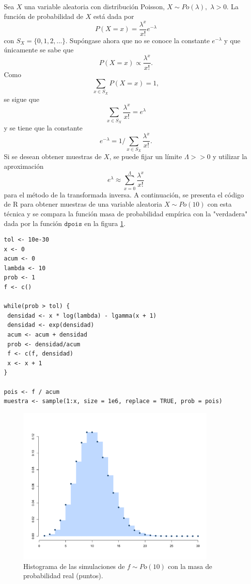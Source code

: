 \documentclass[11pt,a4paper]{article}
\begin{document}
Sea $X$ una variable aleatoria con distribución Poisson, $X \sim Po(\lambda),$ $\lambda > 0$. La función de probabilidad de $X$ está dada por
$$P(X = x) = \frac{\lambda ^ x}{x!}e^{-\lambda}$$ con $S_X = \lbrace 0, 1, 2, \dots \rbrace$. Supóngase ahora que no se conoce la constante $e^{-\lambda}$ y que únicamente se sabe que $$P(X = x) \propto  \frac{\lambda ^ x}{x!}.$$ Como $$\sum_{x \in S_X} P(X = x) = 1,$$ se sigue que $$\sum_{x \in S_X} \frac{\lambda ^ x}{x!} = e^{\lambda}$$ y se tiene que la constante $$e^{-\lambda} = 1 /\sum_{x \in S_X} \frac{\lambda ^ x}{x!}.$$ Si se desean obtener muestras de $X$, se puede fijar un límite $\Lambda >> 0$ y utilizar la aproximación $$ e^{\lambda} \approx \sum_{x = 0}^{\Lambda} \frac{\lambda ^ x}{x!}$$ para el método de la transformada inversa. A continuación, se presenta el código de R para obtener muestras de una variable aleatoria $X \sim Po(10)$ con esta técnica y se compara la función masa de probabilidad empírica con la "verdadera" dada por la función $\mathtt{dpois}$ en la figura \ref{fig:poisson}.\\

\begin{lstlisting}
tol <- 10e-30
x <- 0
acum <- 0
lambda <- 10
prob <- 1
f <- c()

while(prob > tol) {
 densidad <- x * log(lambda) - lgamma(x + 1)
 densidad <- exp(densidad)
 acum <- acum + densidad
 prob <- densidad/acum
 f <- c(f, densidad)
 x <- x + 1
}

pois <- f / acum
muestra <- sample(1:x, size = 1e6, replace = TRUE, prob = pois)
\end{lstlisting}

\begin{figure}[h]
\centering\includegraphics[width=10cm]{poisson.png}
\caption{Histograma de las simulaciones de $f \sim Po(10)$ con la masa de probabilidad real (puntos).}
\label{fig:poisson}
\end{figure}
\end{document}
